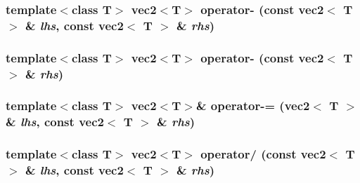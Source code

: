 \hypertarget{classnv_1_1vec2_da5e7f01644574eac325648f2f25670c}{
\subsubsection[{operator-}]{\setlength{\rightskip}{0pt plus 5cm}template$<$class T$>$ {\bf vec2}$<$T$>$ operator- (const {\bf vec2}$<$ T $>$ \& {\em lhs}, \/  const {\bf vec2}$<$ T $>$ \& {\em rhs})}}
\label{classnv_1_1vec2_da5e7f01644574eac325648f2f25670c}


\hypertarget{classnv_1_1vec2_859a796ad57c02d570c28e4cb3f11c1b}{
\subsubsection[{operator-}]{\setlength{\rightskip}{0pt plus 5cm}template$<$class T$>$ {\bf vec2}$<$T$>$ operator- (const {\bf vec2}$<$ T $>$ \& {\em rhs})}}
\label{classnv_1_1vec2_859a796ad57c02d570c28e4cb3f11c1b}


\hypertarget{classnv_1_1vec2_9cffe2e7d8b3f0754685b3d1044471a7}{
\subsubsection[{operator-=}]{\setlength{\rightskip}{0pt plus 5cm}template$<$class T$>$ {\bf vec2}$<$T$>$\& operator-= ({\bf vec2}$<$ T $>$ \& {\em lhs}, \/  const {\bf vec2}$<$ T $>$ \& {\em rhs})}}
\label{classnv_1_1vec2_9cffe2e7d8b3f0754685b3d1044471a7}


\hypertarget{classnv_1_1vec2_2ad71189de611e357baac7c2166f10cd}{
\subsubsection[{operator/}]{\setlength{\rightskip}{0pt plus 5cm}template$<$class T$>$ {\bf vec2}$<$T$>$ operator/ (const {\bf vec2}$<$ T $>$ \& {\em lhs}, \/  const {\bf vec2}$<$ T $>$ \& {\em rhs})}}
\label{classnv_1_1vec2_2ad71189de611e357baac7c2166f10cd}


